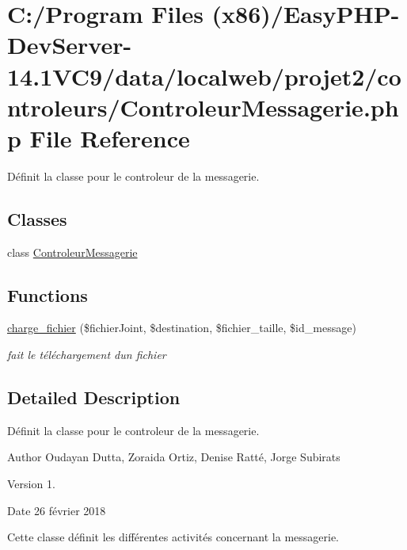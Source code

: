 \hypertarget{_controleur_messagerie_8php}{}\section{C\+:/\+Program Files (x86)/\+Easy\+P\+H\+P-\/\+Dev\+Server-\/14.1\+V\+C9/data/localweb/projet2/controleurs/\+Controleur\+Messagerie.php File Reference}
\label{_controleur_messagerie_8php}


Définit la classe pour le controleur de la messagerie.  


\subsection*{Classes}
\begin{DoxyCompactItemize}
\item 
class \hyperlink{class_controleur_messagerie}{Controleur\+Messagerie}
\end{DoxyCompactItemize}
\subsection*{Functions}
\begin{DoxyCompactItemize}
\item 
\hyperlink{_controleur_messagerie_8php_a63901e0dcd079c4d63c523cf48cdce6c}{charge\+\_\+fichier} (\$fichier\+Joint, \$destination, \$fichier\+\_\+taille, \$id\+\_\+message)
\begin{DoxyCompactList}\small\item\em fait le téléchargement d\textquotesingle{}un fichier \end{DoxyCompactList}\end{DoxyCompactItemize}


\subsection{Detailed Description}
Définit la classe pour le controleur de la messagerie. 

\begin{DoxyAuthor}{Author}
Oudayan Dutta, Zoraida Ortiz, Denise Ratté, Jorge Subirats 
\end{DoxyAuthor}
\begin{DoxyVersion}{Version}
1. 
\end{DoxyVersion}
\begin{DoxyDate}{Date}
26 février 2018
\end{DoxyDate}
Cette classe définit les différentes activités concernant la messagerie. 

